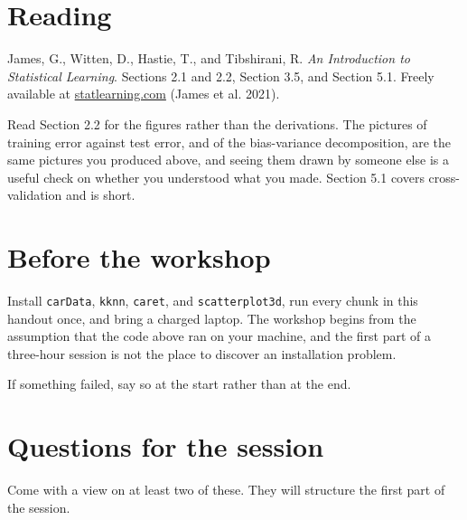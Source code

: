 \documentclass[
  a4paper,
]{scrbook}
\begin{document}
\chapter{Reading}\label{reading-1}

James, G., Witten, D., Hastie, T., and Tibshirani, R. \emph{An
Introduction to Statistical Learning}. Sections 2.1 and 2.2, Section
3.5, and Section 5.1. Freely available at
\href{https://www.statlearning.com/}{statlearning.com} (James et al.
2021).

Read Section 2.2 for the figures rather than the derivations. The
pictures of training error against test error, and of the bias-variance
decomposition, are the same pictures you produced above, and seeing them
drawn by someone else is a useful check on whether you understood what
you made. Section 5.1 covers cross-validation and is short.

\chapter{Before the workshop}\label{before-the-workshop}

Install \texttt{carData}, \texttt{kknn}, \texttt{caret}, and
\texttt{scatterplot3d}, run every chunk in this handout once, and bring
a charged laptop. The workshop begins from the assumption that the code
above ran on your machine, and the first part of a three-hour session is
not the place to discover an installation problem.

If something failed, say so at the start rather than at the end.

\chapter{Questions for the session}\label{questions-for-the-session-1}

Come with a view on at least two of these. They will structure the first
part of the session.
\end{document}
